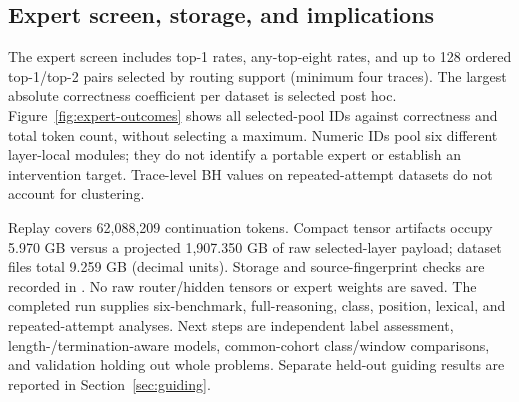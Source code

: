 \subsection{Expert screen, storage, and implications}



The expert screen includes top-1 rates, any-top-eight rates, and up to 128
ordered top-1/top-2 pairs selected by routing support (minimum four traces).
The largest absolute correctness coefficient per dataset is selected
post hoc. Figure~\ref{fig:expert-outcomes} shows all selected-pool IDs against
correctness and total token count, without selecting a maximum. Numeric IDs pool six different layer-local modules; they do not
identify a portable expert or establish an intervention target. Trace-level
BH values on repeated-attempt datasets do not account for clustering.



Replay covers 62,088,209 continuation tokens. Compact tensor artifacts
occupy 5.970 GB versus a projected 1,907.350 GB of raw selected-layer
payload; dataset files total 9.259 GB (decimal units).
Storage and source-fingerprint checks are recorded in
. No raw router/hidden tensors or
expert weights are saved. The completed run supplies six-benchmark,
full-reasoning, class, position, lexical, and repeated-attempt analyses.
Next steps are independent label assessment, length-/termination-aware
models, common-cohort class/window comparisons, and validation holding out
whole problems. Separate held-out guiding results are reported in
Section~\ref{sec:guiding}.
